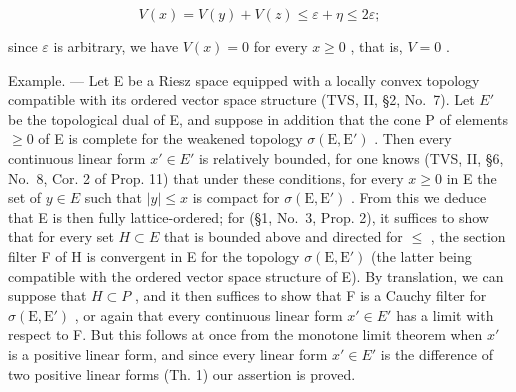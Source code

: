 \[
V (x) = V (y) + V (z) \leqslant \varepsilon + \eta \leqslant 2 \varepsilon ;
\]

since \(\varepsilon\) is arbitrary, we have \(V(x) = 0\) for every \(x \geqslant 0\) , that is, \(V = 0\) .

Example. --- Let E be a Riesz space equipped with a locally convex topology compatible with its ordered vector space structure (TVS, II, §2, No.~7). Let \(E'\) be the topological dual of E, and suppose in addition that the cone P of elements \(\geqslant 0\) of E is complete for the weakened topology \(\sigma(\mathrm{E},\mathrm{E}')\) . Then every continuous linear form \(x' \in E'\) is relatively bounded, for one knows (TVS, II, §6, No.~8, Cor. 2 of Prop. 11) that under these conditions, for every \(x \geqslant 0\) in E the set of \(y \in E\) such that \(|y| \leqslant x\) is compact for \(\sigma(\mathrm{E},\mathrm{E}')\) . From this we deduce that E is then fully lattice-ordered; for (§1, No.~3, Prop. 2), it suffices to show that for every set \(H \subset E\) that is bounded above and directed for \(\leqslant\) , the section filter F of H is convergent in E for the topology \(\sigma(\mathrm{E},\mathrm{E}')\) (the latter being compatible with the ordered vector space structure of E). By translation, we can suppose that \(H \subset P\) , and it then suffices to show that F is a Cauchy filter for \(\sigma(\mathrm{E},\mathrm{E}')\) , or again that every continuous linear form \(x' \in E'\) has a limit with respect to F. But this follows at once from the monotone limit theorem when \(x'\) is a positive linear form, and since every linear form \(x' \in E'\) is the difference of two positive linear forms (Th. 1) our assertion is proved.
